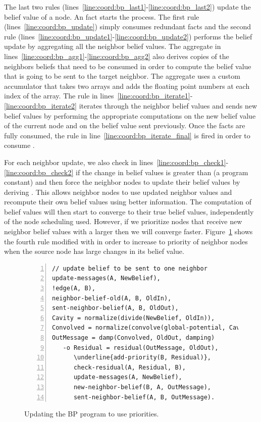 The last two rules (lines~\ref{line:coord:bp_last1}-\ref{line:coord:bp_last2})
update the belief value of a node. An  fact starts the process.
The first rule (lines~\ref{line:coord:bp_update}) simply consumes redundant
 facts and the second rule
(lines~\ref{line:coord:bp_update1}-\ref{line:coord:bp_update2}) performs the
belief update by aggregating all the neighbor belief values. The aggregate in
lines~\ref{line:coord:bp_agg1}-\ref{line:coord:bp_agg2} also derives copies of
the neighbors beliefs that need to be consumed in order to compute the belief
value that is going to be sent to the target neighbor. The aggregate uses a
custom accumulator that takes two arrays and adds the floating point numbers at
each index of the array. The rule in
lines~\ref{line:coord:bp_iterate1}-\ref{line:coord:bp_iterate2} iterates through
the neighbor belief values and sends new belief values by performing the
appropriate computations on the new belief value of the current node and on the
belief value sent previously.  Once the facts  are
fully consumed, the rule in line~\ref{line:coord:bp_iterate_final} is fired in
order to consume .

For each neighbor update, we also check in
lines~\ref{line:coord:bp_check1}-\ref{line:coord:bp_check2} if the change in
belief values is greater than  (a program constant) and then force
the neighbor nodes to update their belief values by deriving .
This allows neighbor nodes to use updated neighbor values and recompute their
own belief values using better information. The computation of belief values
will then start to converge to their true belief values, independently of the
node scheduling used. However, if we prioritize nodes that receive new neighbor
belief values with a larger  then we will converge faster.
Figure~\ref{code:coordination:improved_bp} shows the fourth rule modified with
 in order to increase to priority of neighbor nodes when the
source node has large changes in its belief value.

\begin{figure}[h!]
\begin{Verbatim}[numbers=left,commandchars=\\\{\},fontsize=\codesize]
// update belief to be sent to one neighbor
update-messages(A, NewBelief),
!edge(A, B),
neighbor-belief-old(A, B, OldIn),
sent-neighbor-belief(A, B, OldOut),
Cavity = normalize(divide(NewBelief, OldIn)),
Convolved = normalize(convolve(global-potential, Cavity)),
OutMessage = damp(Convolved, OldOut, damping)
   -o Residual = residual(OutMessage, OldOut),
      \underline{add-priority(B, Residual)},
      check-residual(A, Residual, B),
      update-messages(A, NewBelief),
      new-neighbor-belief(B, A, OutMessage),
      sent-neighbor-belief(A, B, OutMessage).
\end{Verbatim}
\caption{Updating the BP program to use priorities.}
\label{code:coordination:improved_bp}
\end{figure}

